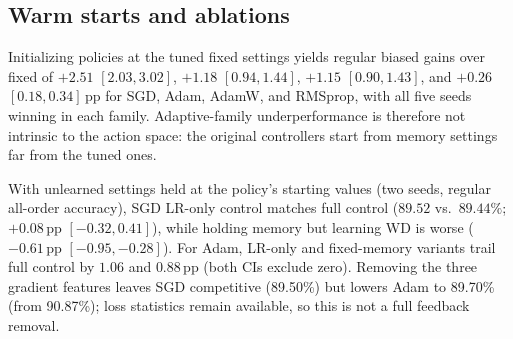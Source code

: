 \documentclass{article}
\newcommand{\pp}{\ensuremath{\,\mathrm{pp}}}
\begin{document}
\subsection{Warm starts and ablations}
Initializing policies at the tuned fixed settings yields regular biased gains over fixed of $+2.51$ $[2.03,3.02]$, $+1.18$ $[0.94,1.44]$, $+1.15$ $[0.90,1.43]$, and $+0.26$ $[0.18,0.34]\pp$ for SGD, Adam, AdamW, and RMSprop, with all five seeds winning in each family. Adaptive-family underperformance is therefore not intrinsic to the action space: the original controllers start from memory settings far from the tuned ones.

With unlearned settings held at the policy's starting values (two seeds, regular all-order accuracy), SGD LR-only control matches full control ($89.52$ vs.\ $89.44\%$; $+0.08\pp$ $[-0.32,0.41]$), while holding memory but learning WD is worse ($-0.61\pp$ $[-0.95,-0.28]$). For Adam, LR-only and fixed-memory variants trail full control by $1.06$ and $0.88\pp$ (both CIs exclude zero). Removing the three gradient features leaves SGD competitive (89.50\%) but lowers Adam to 89.70\% (from 90.87\%); loss statistics remain available, so this is not a full feedback removal.
\end{document}
